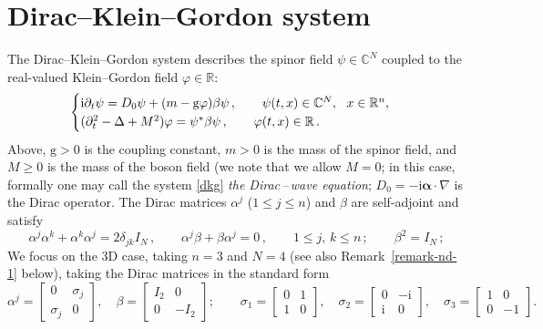 \documentclass[12pt]{extarticle}
\newcommand{\coupling}{\mathrm{g}}
\newcommand{\jj}{\mathrm{i}}
\newcommand{\p}{\partial}
\def\R{\mathbb{R}}
\newcommand{\C}{\mathbb{C}}\newcommand{\Z}{\mathbb{Z}}
\theoremstyle{plain}
\theoremstyle{remark}
\begin{document}
\section{Dirac--Klein--Gordon system}
\label{sect-dkg}

The Dirac--Klein--Gordon system
describes
the spinor field
$\psi\in\C^N$
coupled to the real-valued
Klein--Gordon field $\varphi\in\R$:
\begin{equation}\label{dkg}
    \begin{cases}
        \jj\p\sb{t}\psi
        =D_0\psi+(m-\coupling \varphi)\beta\psi\,,
        \qquad
        \psi(t,x)\in\C^N,
        \ \ x\in\R^n,
        \\
        (\p_t^2-\Delta+M^2)
        \varphi
        =\psi^*\beta\psi\,,
        \qquad
        \varphi(t,x)\in\R\,.
    \end{cases}
\end{equation}
Above, $\coupling>0$ is the coupling constant,
$m>0$ is the mass of the spinor field,
and $M\ge 0$ is the mass of the boson field
(we note that we allow $M=0$;
in this case, formally one may call
the system
\eqref{dkg} \emph{the Dirac\,--\,wave equation};
$D_0 = -\jj\bm\alpha\cdot\nabla$
is the Dirac operator.
The Dirac matrices
$\alpha^j$ ($1\le j\le n$)
and $\beta$
are self-adjoint
and satisfy
\begin{equation}\label{anti-alpha}
\alpha^j\alpha^k
+\alpha^k\alpha^j=2\delta_{j k} I_N\,,
\qquad
\alpha^j\beta
+\beta\alpha^j=0\,,
\qquad
1\le j,\,k\le n\,;
\qquad
\beta^2=I_N\,;
\end{equation}
We focus on the 3D case,
taking $n=3$ and $N=4$
(see also Remark~\ref{remark-nd-1}
below),
taking the Dirac matrices in the standard form
\[
    \alpha^j
    =
    \begin{bmatrix} 0&\sigma_j
    \\ \sigma_j&0\end{bmatrix},
    \quad
    \beta
    =
    \begin{bmatrix} I_2&0 \\ 0&-I_2\end{bmatrix};
    \qquad
    \sigma_1=\begin{bmatrix}0&1\\1&0\end{bmatrix},
    \quad
    \sigma_2=\begin{bmatrix}0&-\jj\\\jj&0\end{bmatrix},
    \quad
    \sigma_3=\begin{bmatrix}1&0\\0&-1\end{bmatrix}.
\]
\end{document}
